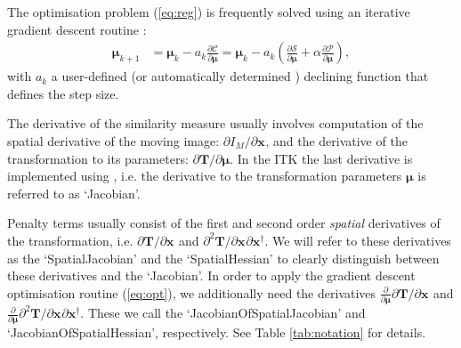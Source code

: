 \documentclass{InsightArticle}
\newcommand{\vT}{\bm{T}}
\newcommand{\vmu}{\bm{\mu}}
\newcommand{\vx}[1][]{\bm{x}_{#1}}
\newcommand{\D}[2]{\frac{\partial #1}{\partial #2}}
\newcommand{\Dinl}[2]{\partial #1 / \partial #2}
\newcommand{\Ddinl}[3]{\partial^2 #1 / \partial #2 \partial #3}
\newcommand{\trp}{^{\dagger}}
\begin{document}
The optimisation problem (\ref{eq:reg}) is frequently solved using
an iterative gradient descent routine \cite{Klein07}:
\begin{align}
\vmu_{k+1} &= \vmu_k - a_k \frac{\partial \mathcal{C}}{\partial
\vmu} = \vmu_k - a_k \left( \frac{\partial \mathcal{S}}{\partial
\vmu} + \alpha \frac{\partial \mathcal{P}}{\partial \vmu}
\right),\label{eq:opt}
\end{align}
with $a_k$ a user-defined (or automatically determined
\cite{Klein09}) declining function that defines the step size.

The derivative of the similarity measure usually involves
computation of the spatial derivative of the moving image:
$\Dinl{I_M}{\vx}$, and the derivative of the transformation to its
parameters: $\Dinl{\vT}{\vmu}$. In the ITK the last derivative is
implemented using , i.e. the
derivative to the transformation parameters $\vmu$ is referred to as
`Jacobian'.

Penalty terms usually consist of the first and second order
\emph{spatial} derivatives of the transformation, i.e.
$\Dinl{\vT}{\vx}$ and $\Ddinl{\vT}{\vx}{\vx\trp}$. We will refer to
these derivatives as the `SpatialJacobian' and the `SpatialHessian'
to clearly distinguish between these derivatives and the `Jacobian'.
In order to apply the gradient descent optimisation routine
(\ref{eq:opt}), we additionally need the derivatives $\D{}{\vmu}
\Dinl{\vT}{\vx}$ and $\D{}{\vmu} \Ddinl{\vT}{\vx}{\vx\trp}$. These
we call the `JacobianOfSpatialJacobian' and
`JacobianOfSpatialHessian', respectively. See Table
\ref{tab:notation} for details.
\end{document}
